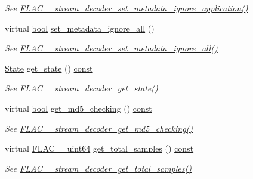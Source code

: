 \begin{DoxyCompactItemize}
\begin{DoxyCompactList}\small\item\em See \hyperlink{group__flac__stream__decoder_gac5eb8b3cb8df3afe788046317fbe9fb6}{F\+L\+A\+C\+\_\+\+\_\+stream\+\_\+decoder\+\_\+set\+\_\+metadata\+\_\+ignore\+\_\+application()} \end{DoxyCompactList}\item 
virtual \hyperlink{mac_2config_2i386_2lib-src_2libsoxr_2soxr-config_8h_abb452686968e48b67397da5f97445f5b}{bool} \hyperlink{class_f_l_a_c_1_1_decoder_1_1_stream_a8d71c06229f35f8225b04f8f1b255c22}{set\+\_\+metadata\+\_\+ignore\+\_\+all} ()
\begin{DoxyCompactList}\small\item\em See \hyperlink{group__flac__stream__decoder_ga6e515420f5b2a5422cd333b3d4c21064}{F\+L\+A\+C\+\_\+\+\_\+stream\+\_\+decoder\+\_\+set\+\_\+metadata\+\_\+ignore\+\_\+all()} \end{DoxyCompactList}\item 
\hyperlink{class_f_l_a_c_1_1_decoder_1_1_stream_1_1_state}{State} \hyperlink{class_f_l_a_c_1_1_decoder_1_1_stream_a3b1b297dbdfcdf95003419f5f4da68fc}{get\+\_\+state} () \hyperlink{getopt1_8c_a2c212835823e3c54a8ab6d95c652660e}{const} 
\begin{DoxyCompactList}\small\item\em See \hyperlink{group__flac__stream__decoder_ga5899c204ad7183ec04e41855090c0635}{F\+L\+A\+C\+\_\+\+\_\+stream\+\_\+decoder\+\_\+get\+\_\+state()} \end{DoxyCompactList}\item 
virtual \hyperlink{mac_2config_2i386_2lib-src_2libsoxr_2soxr-config_8h_abb452686968e48b67397da5f97445f5b}{bool} \hyperlink{class_f_l_a_c_1_1_decoder_1_1_stream_a343bc2bd2c6778608fad877c8299807b}{get\+\_\+md5\+\_\+checking} () \hyperlink{getopt1_8c_a2c212835823e3c54a8ab6d95c652660e}{const} 
\begin{DoxyCompactList}\small\item\em See \hyperlink{group__flac__stream__decoder_ga3b19d2a761ea61cc57b12e31a5c1adf6}{F\+L\+A\+C\+\_\+\+\_\+stream\+\_\+decoder\+\_\+get\+\_\+md5\+\_\+checking()} \end{DoxyCompactList}\item 
virtual \hyperlink{ordinals_8h_aa78c8c70a3eb8a58af7436f278acde8e}{F\+L\+A\+C\+\_\+\+\_\+uint64} \hyperlink{class_f_l_a_c_1_1_decoder_1_1_stream_a473c0bfe0770a8902e202ae3bc1cfb38}{get\+\_\+total\+\_\+samples} () \hyperlink{getopt1_8c_a2c212835823e3c54a8ab6d95c652660e}{const} 
\begin{DoxyCompactList}\small\item\em See \hyperlink{group__flac__stream__decoder_ga68a80ea677bf4abb535abd8f28f2183c}{F\+L\+A\+C\+\_\+\+\_\+stream\+\_\+decoder\+\_\+get\+\_\+total\+\_\+samples()} \end{DoxyCompactList}\item 

\end{DoxyCompactItemize}
